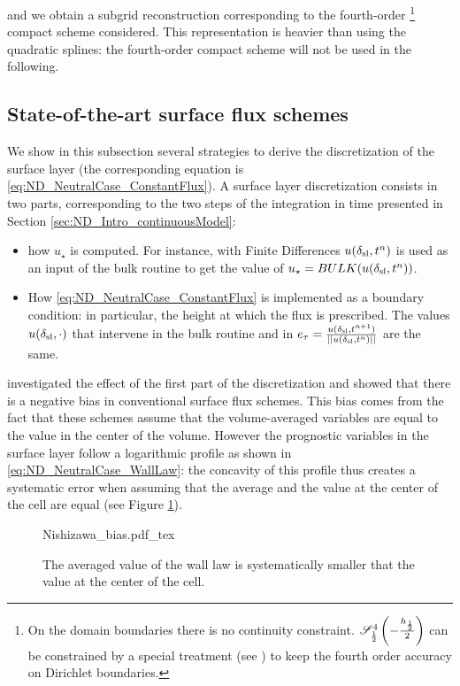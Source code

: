 and we obtain a subgrid reconstruction corresponding to
the fourth-order
\footnote{
On the domain boundaries there is no continuity constraint.
${\cal S}^4_{\frac{1}{2}}\left(-\frac{h_{\frac{1}{2}}}{2}\right)$
can be constrained by a special treatment
(see \cite{piller_finite-volume_2004})
to keep the fourth order accuracy on Dirichlet boundaries.
}
compact scheme considered.
This representation is heavier than using the quadratic splines:
the fourth-order compact scheme will not be used in the
following.


\subsection{State-of-the-art surface flux schemes}
\label{sec:ND_NeutralCase_strategies}
We show in this subsection several strategies to derive the
discretization of the surface layer (the corresponding equation
is \eqref{eq:ND_NeutralCase_ConstantFlux}).
A surface layer discretization consists in two parts,
corresponding to the two steps of the integration in time
presented in Section \ref{sec:ND_Intro_continuousModel}:
\begin{itemize}
	\item how $u_\star$ is computed.
		For instance, with Finite Differences
		$u(\delta_{\rm sl}, t^n)$ is 
		used as an input of the
		bulk routine to get the value of
		$u_\star = BULK(u(\delta_{\rm sl}, t^n))$.
	\item How \eqref{eq:ND_NeutralCase_ConstantFlux}
		is implemented as
		a boundary condition: in particular,
		the height at which the flux is prescribed.
		The values $u(\delta_{\rm sl}, \cdot)$ that intervene
		in the bulk routine and in
		$e_\tau= \frac{u(\delta_{\rm sl},
		t^{n+1})}
		{||u(\delta_{\rm sl}, t^n)||}$
		are the same.
\end{itemize}
\cite{nishizawa_surface_2018} investigated the effect of the
first part of the discretization and showed that there is a
negative bias in conventional surface flux schemes. This
bias comes from the fact that these schemes assume that the
volume-averaged variables are equal to the value in the center
of the volume. However the prognostic variables in the surface layer
follow a logarithmic profile as shown in
\eqref{eq:ND_NeutralCase_WallLaw}: the concavity of this profile thus
creates a systematic error when assuming that the average and the
value at the center of the cell are equal
(see Figure \ref{fig:ND_NeutralCase_nishizawaBias}).
\begin{figure}
	\centering
	{Nishizawa_bias.pdf_tex}
	\caption{The averaged value of the wall law is
		systematically smaller that the value at
		the center of the cell.}
	\label{fig:ND_NeutralCase_nishizawaBias}
\end{figure}
